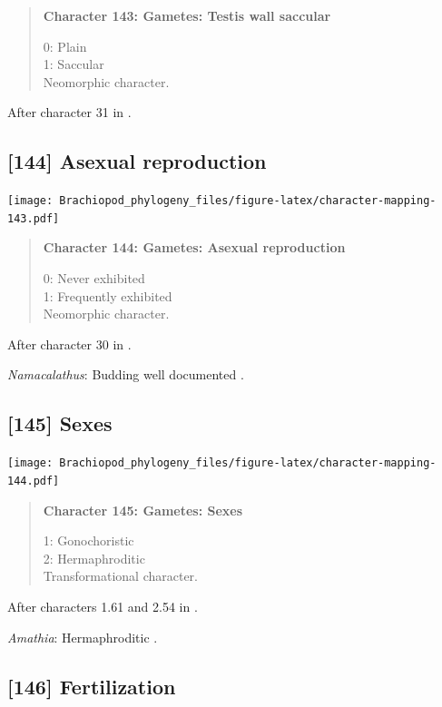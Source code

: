 \documentclass[openany]{book}
\begin{document}
\begin{quote}
\textbf{Character 143: Gametes: Testis wall saccular}

0: Plain\\
1: Saccular\\
Neomorphic character.
\end{quote}

After character 31 in \citet{Haszprunar1996}.

\subsection*{{[}144{]} Asexual reproduction}\label{asexual-reproduction}

\texttt{[image: Brachiopod\_phylogeny\_files/figure-latex/character-mapping-143.pdf]}

\begin{quote}
\textbf{Character 144: Gametes: Asexual reproduction}

0: Never exhibited\\
1: Frequently exhibited\\
Neomorphic character.
\end{quote}

After character 30 in \citet{Haszprunar1996}.

\hypertarget{Namacalathus-coding-144}{}
\emph{Namacalathus}: Budding well documented
\citep[e.g.][]{Zhuravlev2015Ediacaranskeletal}.

\subsection*{{[}145{]} Sexes}\label{sexes}

\texttt{[image: Brachiopod\_phylogeny\_files/figure-latex/character-mapping-144.pdf]}

\begin{quote}
\textbf{Character 145: Gametes: Sexes}

1: Gonochoristic\\
2: Hermaphroditic\\
Transformational character.
\end{quote}

After characters 1.61 and 2.54 in \citet{SPS1996}.

\hypertarget{Amathia-coding-145}{}
\emph{Amathia}: Hermaphroditic \citep{Reed1988}.

\subsection*{{[}146{]} Fertilization}\label{fertilization}
\end{document}
